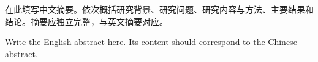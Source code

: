 \newcommand{\thesisTitle}{在此填写中文论文题目}
\newcommand{\thesisTitleEn}{YOUR THESIS TITLE IN ENGLISH}
\newcommand{\thesisType}{学术学位论文} %
\newcommand{\authorName}{填写姓名}
\newcommand{\authorNameEn}{Your Name}
\newcommand{\supervisor}{填写导师及职称}
\newcommand{\supervisorEn}{Prof. Your Supervisor}
\newcommand{\degreeName}{工学硕士}
\newcommand{\degreeNameEn}{Master of Engineering}
\newcommand{\specialty}{建筑学}
\newcommand{\specialtyEn}{Architecture}
\newcommand{\submissionDate}{2026年12月}
\newcommand{\defenseDate}{2026年12月}
\newcommand{\defenseDateEn}{December, 2026}
\newcommand{\classification}{待填写}
\newcommand{\udc}{待填写}
\newcommand{\schoolCode}{待填写}


\makecover\makeinnertitles\frontmatter
\begin{cnabstract}
在此填写中文摘要。依次概括研究背景、研究问题、研究内容与方法、主要结果和结论。摘要应独立完整，与英文摘要对应。
\end{cnabstract}
\begin{enabstract}
Write the English abstract here. Its content should correspond to the Chinese abstract.
\end{enabstract}

\clearpage\tableofcontents

